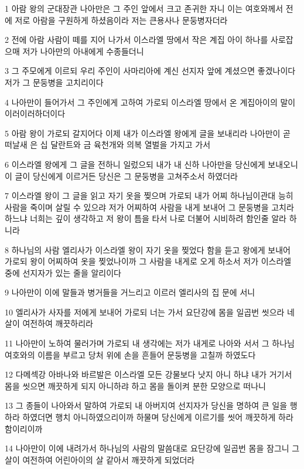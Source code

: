 \par 1 아람 왕의 군대장관 나아만은 그 주인 앞에서 크고 존귀한 자니 이는 여호와께서 전에 저로 아람을 구원하게 하셨음이라 저는 큰용사나 문둥병자더라
\par 2 전에 아람 사람이 떼를 지어 나가서 이스라엘 땅에서 작은 계집 아이 하나를 사로잡으매 저가 나아만의 아내에게 수종들더니
\par 3 그 주모에게 이르되 우리 주인이 사마리아에 계신 선지자 앞에 계셨으면 좋겠나이다 저가 그 문둥병을 고치리이다
\par 4 나아만이 들어가서 그 주인에게 고하여 가로되 이스라엘 땅에서 온 계집아이의 말이 이러이러하더이다
\par 5 아람 왕이 가로되 갈지어다 이제 내가 이스라엘 왕에게 글을 보내리라 나아만이 곧 떠날새 은 십 달란트와 금 육천개와 의복 열벌을 가지고 가서
\par 6 이스라엘 왕에게 그 글을 전하니 일렀으되 내가 내 신하 나아만을 당신에게 보내오니 이 글이 당신에게 이르거든 당신은 그 문둥병을 고쳐주소서 하였더라
\par 7 이스라엘 왕이 그 글을 읽고 자기 옷을 찢으며 가로되 내가 어찌 하나님이관대 능히 사람을 죽이며 살릴 수 있으랴 저가 어찌하여 사람을 내게 보내어 그 문둥병을 고치라 하느냐 너희는 깊이 생각하고 저 왕이 틈을 타서 나로 더불어 시비하려 함인줄 알라 하니라
\par 8 하나님의 사람 엘리사가 이스라엘 왕이 자기 옷을 찢었다 함을 듣고 왕에게 보내어 가로되 왕이 어찌하여 옷을 찢었나이까 그 사람을 내게로 오게 하소서 저가 이스라엘 중에 선지자가 있는 줄을 알리이다
\par 9 나아만이 이에 말들과 병거들을 거느리고 이르러 엘리사의 집 문에 서니
\par 10 엘리사가 사자를 저에게 보내어 가로되 너는 가서 요단강에 몸을 일곱번 씻으라 네 살이 여전하여 깨끗하리라
\par 11 나아만이 노하여 물러가며 가로되 내 생각에는 저가 내게로 나아와 서서 그 하나님 여호와의 이름을 부르고 당처 위에 손을 흔들어 문둥병을 고칠까 하였도다
\par 12 다메섹강 아바나와 바르발은 이스라엘 모든 강물보다 낫지 아니 하냐 내가 거기서 몸을 씻으면 깨끗하게 되지 아니하랴 하고 몸을 돌이켜 분한 모양으로 떠나니
\par 13 그 종들이 나아와서 말하여 가로되 내 아버지여 선지자가 당신을 명하여 큰 일을 행하라 하였더면 행치 아니하였으리이까 하물며 당신에게 이르기를 씻어 깨끗하게 하라 함이리이까
\par 14 나아만이 이에 내려가서 하나님의 사람의 말씀대로 요단강에 일곱번 몸을 잠그니 그 살이 여전하여 어린아이의 살 같아서 깨끗하게 되었더라
